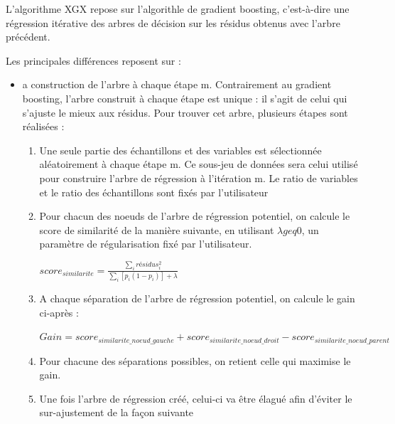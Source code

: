 \documentclass[
]{article}
\begin{document}
L'algorithme XGX repose sur l'algorithle de gradient boosting,
c'est-à-dire une régression itérative des arbres de décision sur les
résidus obtenus avec l'arbre précédent.

Les principales différences reposent sur :

\begin{itemize}

   \item a construction de l’arbre à chaque étape m. Contrairement au gradient boosting, l’arbre construit à chaque étape est unique : il s’agit de celui qui s’ajuste le mieux aux résidus. Pour trouver cet arbre, plusieurs étapes sont réalisées :
   
   \begin{enumerate}
   
      \item Une seule partie des échantillons et des variables est sélectionnée aléatoirement à chaque étape m. Ce sous-jeu de données sera celui utilisé pour construire l’arbre de régression à l’itération m. Le ratio de variables et le ratio des échantillons sont fixés par l’utilisateur
      
      \item Pour chacun des noeuds de l’arbre de régression potentiel, on calcule le score de similarité de la manière suivante, en utilisant $\lambda geq 0$, un paramètre de régularisation fixé par l'utilisateur. 
      
      \begin{center}
          $score_{similarite}=\frac{\sum_i résidus_i^2}{\sum_i[p_i(1-p_i)]+\lambda}$
      \end{center}
      
      \item A chaque séparation de l’arbre de régression potentiel, on calcule le gain ci-après :
      
      \begin{center}
          $Gain=score_{similarite\_noeud\_gauche}+score_{similarite\_noeud\_droit}-score_{similarite\_noeud\_parent}$
      \end{center}
      
      \item Pour chacune des séparations possibles, on retient celle qui maximise le gain. 
      
      \item Une fois l’arbre de régression créé, celui-ci va être élagué afin d’éviter le sur-ajustement de la façon suivante
      

\end{enumerate}
\end{itemize}
\end{document}
